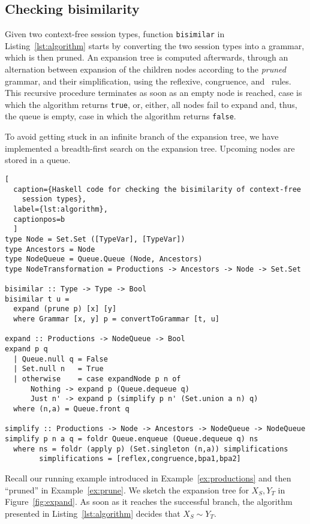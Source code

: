 \subsection{Checking bisimilarity}


Given two context-free session types, function \lstinline|bisimilar|
in Listing~\ref{lst:algorithm} starts by converting the two session
types into a grammar, which is then pruned. An expansion tree is
computed afterwards, through an alternation between expansion of the
children nodes according to the \emph{pruned} grammar, and their
simplification, using the reflexive, congruence, and \BPA\ rules. This
recursive procedure terminates as soon as an empty node is reached,
case is which the algorithm returns \lstinline|true|, or, either, all
nodes fail to expand and, thus, the queue is empty, case in which the
algorithm returns \lstinline|false|.

To avoid getting stuck in an
infinite branch of the expansion tree, we have implemented
a breadth-first search on the expansion tree. Upcoming nodes are stored
in a queue.

\begin{lstlisting}[
  caption={Haskell code for checking the bisimilarity of context-free
    session types},
  label={lst:algorithm},
  captionpos=b
  ]
type Node = Set.Set ([TypeVar], [TypeVar])
type Ancestors = Node
type NodeQueue = Queue.Queue (Node, Ancestors)
type NodeTransformation = Productions -> Ancestors -> Node -> Set.Set

bisimilar :: Type -> Type -> Bool
bisimilar t u =
  expand (prune p) [x] [y]
  where Grammar [x, y] p = convertToGrammar [t, u]

expand :: Productions -> NodeQueue -> Bool
expand p q
  | Queue.null q = False 
  | Set.null n   = True
  | otherwise    = case expandNode p n of
      Nothing -> expand p (Queue.dequeue q)
      Just n' -> expand p (simplify p n' (Set.union a n) q)
  where (n,a) = Queue.front q

simplify :: Productions -> Node -> Ancestors -> NodeQueue -> NodeQueue
simplify p n a q = foldr Queue.enqueue (Queue.dequeue q) ns
  where ns = foldr (apply p) (Set.singleton (n,a)) simplifications
        simplifications = [reflex,congruence,bpa1,bpa2]
\end{lstlisting}

\begin{example}
	Recall our running example introduced in Example~\ref{ex:productions} and then
	``pruned'' in Example~\ref{ex:prune}. We sketch the expansion tree for
	$X_S, Y_T$ in Figure~\ref{fig:expand}. As soon as it reaches
	the successful branch, the algorithm presented in Listing~\ref{lst:algorithm}
	decides that $X_S\sim Y_T$.
\end{example}


